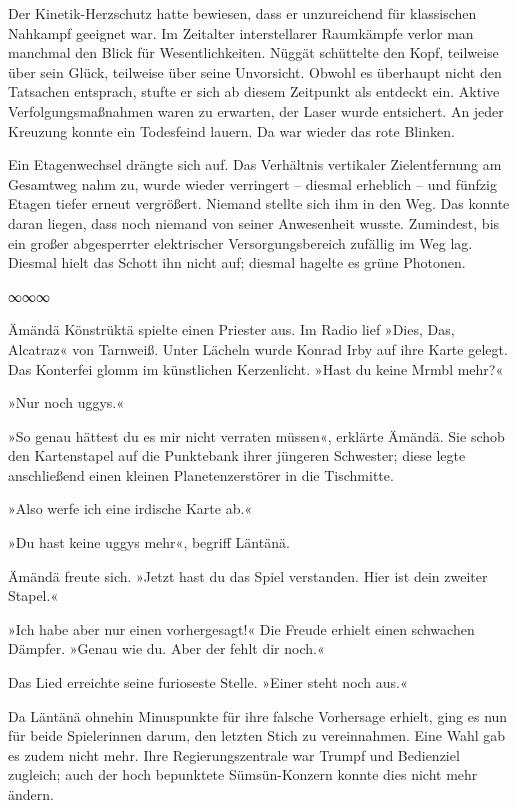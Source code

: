 Der Kinetik-Herzschutz hatte bewiesen, dass er unzureichend für klassischen Nahkampf geeignet war. Im Zeitalter interstellarer Raumkämpfe verlor man manchmal den Blick für Wesentlichkeiten. Nüggät schüttelte den Kopf, teilweise über sein Glück, teilweise über seine Unvorsicht. Obwohl es überhaupt nicht den Tatsachen entsprach, stufte er sich ab diesem Zeitpunkt als entdeckt ein. Aktive Verfolgungsmaßnahmen waren zu erwarten, der Laser wurde entsichert. An jeder Kreuzung konnte ein Todesfeind lauern. Da war wieder das rote Blinken.

Ein Etagenwechsel drängte sich auf. Das Verhältnis vertikaler Zielentfernung am Gesamtweg nahm zu, wurde wieder verringert – diesmal erheblich – und fünfzig Etagen tiefer erneut vergrößert. Niemand stellte sich ihm in den Weg. Das konnte daran liegen, dass noch niemand von seiner Anwesenheit wusste. Zumindest, bis ein großer abgesperrter elektrischer Versorgungsbereich zufällig im Weg lag. Diesmal hielt das Schott ihn nicht auf; diesmal hagelte es grüne Photonen.

\begin{center}
	∞∞∞
\end{center}

Ämändä Könstrüktä spielte einen Priester aus. Im Radio lief »Dies, Das, Alcatraz« von Tarnweiß. Unter Lächeln wurde Konrad Irby auf ihre Karte gelegt. Das Konterfei glomm im künstlichen Kerzenlicht. »Hast du keine Mrmbl mehr?«

»Nur noch uggys.«

»So genau hättest du es mir nicht verraten müssen«, erklärte Ämändä. Sie schob den Kartenstapel auf die Punktebank ihrer jüngeren Schwester; diese legte anschließend einen kleinen Planetenzerstörer in die Tischmitte.

»Also werfe ich eine irdische Karte ab.«

»Du hast keine uggys mehr«, begriff Läntänä.

Ämändä freute sich. »Jetzt hast du das Spiel verstanden. Hier ist dein zweiter Stapel.«

»Ich habe aber nur einen vorhergesagt!« Die Freude erhielt einen schwachen Dämpfer. »Genau wie du. Aber der fehlt dir noch.«

Das Lied erreichte seine furioseste Stelle. »Einer steht noch aus.«

Da Läntänä ohnehin Minuspunkte für ihre falsche Vorhersage erhielt, ging es nun für beide Spielerinnen darum, den letzten Stich zu vereinnahmen. Eine Wahl gab es zudem nicht mehr. Ihre Regierungszentrale war Trumpf und Bedienziel zugleich; auch der hoch bepunktete Sümsün-Konzern konnte dies nicht mehr ändern.

